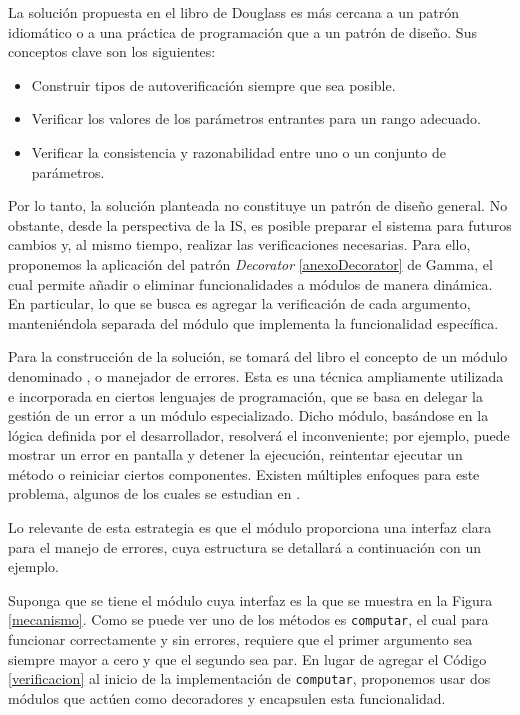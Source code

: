 La solución propuesta en el libro de Douglass \cite{douglass} es más cercana a un patrón idiomático o a una práctica de programación que a un patrón de diseño. Sus conceptos clave son los siguientes:

\begin{itemize}
    \item Construir tipos de autoverificación siempre que sea posible.
    \item Verificar los valores de los parámetros entrantes para un rango adecuado.
    \item Verificar la consistencia y razonabilidad entre uno o un conjunto de parámetros.
\end{itemize}

Por lo tanto, la solución planteada no constituye un patrón de diseño general. No obstante, desde la perspectiva de la \gls{IS}, es posible preparar el sistema para futuros cambios y, al mismo tiempo, realizar las verificaciones necesarias. Para ello, proponemos la aplicación del patrón \textit{Decorator} \ref{anexoDecorator} de Gamma, el cual permite añadir o eliminar funcionalidades a módulos de manera dinámica. En particular, lo que se busca es agregar la verificación de cada argumento, manteniéndola separada del módulo que implementa la funcionalidad específica.


Para la construcción de la solución, se tomará del libro \cite{douglass} el concepto de un módulo denominado \ErrorHandler, o manejador de errores. Esta es una técnica ampliamente utilizada e incorporada en ciertos lenguajes de programación, que se basa en delegar la gestión de un error a un módulo especializado. Dicho módulo, basándose en la lógica definida por el desarrollador, resolverá el inconveniente; por ejemplo, puede mostrar un error en pantalla y detener la ejecución, reintentar ejecutar un método o reiniciar ciertos componentes. Existen múltiples enfoques para este problema, algunos de los cuales se estudian en \cite{glass2009graceful}.

Lo relevante de esta estrategia es que el módulo proporciona una interfaz clara para el manejo de errores, cuya estructura se detallará a continuación con un ejemplo.



Suponga que se tiene el módulo \Mecanismo cuya interfaz es la que se muestra en la Figura \ref{mecanismo}. Como se puede ver uno de los métodos es \verb|computar|, el cual para funcionar correctamente y sin errores, requiere que el primer argumento sea siempre mayor a cero y que el segundo sea par. En lugar de agregar el Código \ref{verificacion} al inicio de la implementación de \verb|computar|, proponemos usar dos módulos que actúen como decoradores y encapsulen esta funcionalidad.


